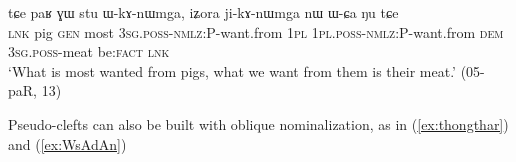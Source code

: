 \documentclass[oneside,a4paper,11pt]{article}
\newcommand{\ipa}[1]{{\phon{#1}}}
\begin{document}




 

\begin{exe}
\ex \label{ex:stu.WkAnWmga}
 \gll tɕe paʁ ɣɯ stu ɯ-kɤ-nɯmga, iʑora ji-kɤ-nɯmga nɯ ɯ-ɕa ŋu tɕe \\
 \textsc{lnk} pig \textsc{gen} most \textsc{3sg}.\textsc{poss}-\textsc{nmlz}:P-want.from \textsc{1pl} \textsc{1pl}.\textsc{poss}-\textsc{nmlz}:P-want.from \textsc{dem} \textsc{3sg}.\textsc{poss}-meat be:\textsc{fact} \textsc{lnk} \\
 \glt  `What is most wanted from pigs, what we want from them is their meat.' (05-paR, 13)
\end{exe}






Pseudo-clefts can also be built with oblique nominalization, as in (\ref{ex:thongthar}) and (\ref{ex:WsAdAn})
\end{document}
